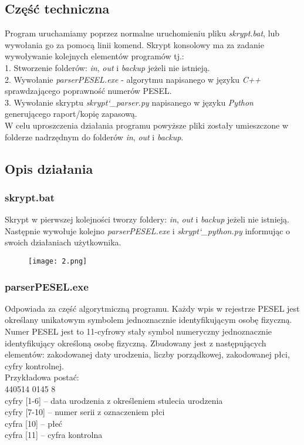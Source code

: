 \documentclass[12pt,a4paper]{article}
\begin{document}
	\subsection*{Część techniczna}
	Program uruchamiamy poprzez normalne uruchomieniu pliku \textit{skrypt.bat}, lub wywołania go za pomocą linii komend. Skrypt konsolowy ma za zadanie wywoływanie kolejnych elementów programów tj.: \\ 1. Stworzenie folderów: \textit{in}, \textit{out} i \textit{backup} jeżeli nie istnieją. \\ 2. Wywołanie \textit{parserPESEL.exe} - algorytmu napisanego w języku \textit{C++} sprawdzającego poprawność numerów PESEL. \\3. Wywołanie skryptu \textit{skrypt\char`_parser.py} napisanego w języku \textit{Python} generującego raport/kopię zapasową.\\W celu uproszczenia działania programu powyższe pliki  zostały umieszczone w folderze nadrzędnym do folderów \textit{in}, \textit{out} i \textit{backup}.
	\subsection*{Opis działania} 
		\subsubsection*{skrypt.bat}
		Skrypt w pierwszej kolejności tworzy foldery: \textit{in}, \textit{out} i \textit{backup} jeżeli nie istnieją. Następnie wywołuje kolejno \textit{parserPESEL.exe} i \textit{skrypt\char`_python.py} informując o swoich działaniach użytkownika.
			\begin{figure}[ht]
    	\centering
  		\texttt{[image: 2.png]}    
    \end{figure}
		
		\subsubsection*{parserPESEL.exe}
		Odpowiada za część algorytmiczną programu. Każdy wpis w rejestrze PESEL jest określany unikatowym symbolem jednoznacznie identyfikującym osobę fizyczną. Numer PESEL jest to 11-cyfrowy stały symbol numeryczny jednoznacznie identyfikujący określoną osobę fizyczną. Zbudowany jest z następujących elementów: zakodowanej daty urodzenia, liczby porządkowej, zakodowanej płci, cyfry kontrolnej.
\\		
Przykładowa postać:\\
440514 	0145 	8
\\
    cyfry [1-6] – data urodzenia z określeniem stulecia urodzenia\\
    cyfry [7-10] – numer serii z oznaczeniem płci\\
        cyfra [10] – płeć\\
    cyfra [11] – cyfra kontrolna	\\	
\end{document}
